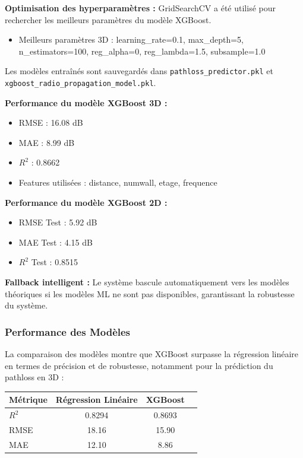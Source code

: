 \documentclass[12pt,a4paper]{article}
\begin{document}
\textbf{Optimisation des hyperparamètres :} GridSearchCV a été utilisé pour rechercher les meilleurs paramètres du modèle XGBoost.
\begin{itemize}
    \item Meilleurs paramètres 3D :  learning\_rate=0.1, max\_depth=5, n\_estimators=100, reg\_alpha=0, reg\_lambda=1.5, subsample=1.0
\end{itemize}


Les modèles entraînés sont sauvegardés dans \texttt{pathloss\_predictor.pkl} et \texttt{xgboost\_radio\_propagation\_model.pkl}.

\textbf{Performance du modèle XGBoost 3D :}
\begin{itemize}
    \item RMSE : 16.08 dB
    \item MAE : 8.99 dB
    \item $R^2$ : 0.8662
    \item Features utilisées : distance, numwall, etage, frequence
\end{itemize}

\textbf{Performance du modèle XGBoost 2D :}
\begin{itemize}
    \item RMSE Test : 5.92 dB
    \item MAE Test : 4.15 dB
    \item $R^2$ Test : 0.8515
\end{itemize}

\textbf{Fallback intelligent :} Le système bascule automatiquement vers les modèles théoriques si les modèles ML ne sont pas disponibles, garantissant la robustesse du système.

\subsubsection{Performance des Modèles}
La comparaison des modèles montre que XGBoost surpasse la régression linéaire en termes de précision et de robustesse, notamment pour la prédiction du pathloss en 3D :
\begin{center}
\begin{tabular}{lccc}
\toprule
Métrique & Régression Linéaire & XGBoost \\
\midrule
$R^2$ & 0.8294 & 0.8693 \\
RMSE & 18.16 & 15.90 \\
MAE & 12.10 & 8.86 \\
\bottomrule
\end{tabular}
\end{center}
\end{document}
